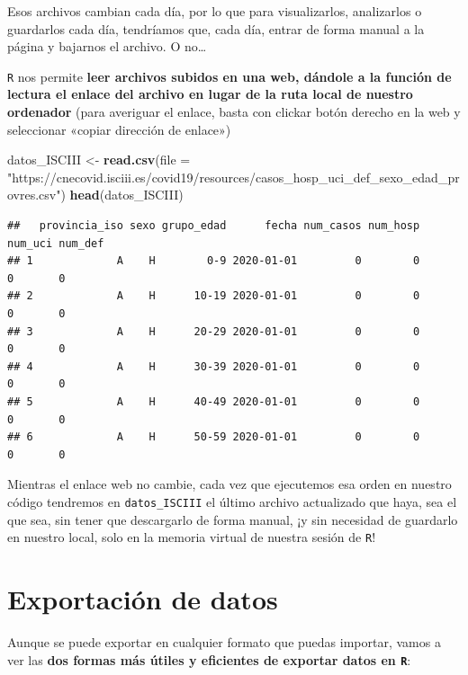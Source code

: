 \documentclass[11pt,]{book}
\newenvironment{Shaded}{\begin{snugshade}}{\end{snugshade}}
\newcommand{\DataTypeTok}[1]{\textcolor[rgb]{0.27,0.27,0.27}{#1}}
\newcommand{\KeywordTok}[1]{\textcolor[rgb]{0.27,0.27,0.27}{\textbf{#1}}}
\newcommand{\NormalTok}[1]{#1}
\newcommand{\StringTok}[1]{\textcolor[rgb]{0.5,0.5,0.5}{#1}}
\begin{document}
Esos archivos cambian cada día, por lo que para visualizarlos, analizarlos o guardarlos cada día, tendríamos que, cada día, entrar de forma manual a la página y bajarnos el archivo. O no\ldots{}

\texttt{R} nos permite \textbf{leer archivos subidos en una web, dándole a la función de lectura el enlace del archivo en lugar de la ruta local de nuestro ordenador} (para averiguar el enlace, basta con clickar botón derecho en la web y seleccionar «copiar dirección de enlace»)

\begin{Shaded}
\begin{Highlighting}[]
\NormalTok{datos_ISCIII <-}\StringTok{ }\KeywordTok{read.csv}\NormalTok{(}\DataTypeTok{file =} \StringTok{"https://cnecovid.isciii.es/covid19/resources/casos_hosp_uci_def_sexo_edad_provres.csv"}\NormalTok{)}
\KeywordTok{head}\NormalTok{(datos_ISCIII)}
\end{Highlighting}
\end{Shaded}

\begin{verbatim}
##   provincia_iso sexo grupo_edad      fecha num_casos num_hosp num_uci num_def
## 1             A    H        0-9 2020-01-01         0        0       0       0
## 2             A    H      10-19 2020-01-01         0        0       0       0
## 3             A    H      20-29 2020-01-01         0        0       0       0
## 4             A    H      30-39 2020-01-01         0        0       0       0
## 5             A    H      40-49 2020-01-01         0        0       0       0
## 6             A    H      50-59 2020-01-01         0        0       0       0
\end{verbatim}

Mientras el enlace web no cambie, cada vez que ejecutemos esa orden en nuestro código tendremos en \texttt{datos\_ISCIII} el último archivo actualizado que haya, sea el que sea, sin tener que descargarlo de forma manual, ¡y sin necesidad de guardarlo en nuestro local, solo en la memoria virtual de nuestra sesión de \texttt{R}!

\hypertarget{exportaciuxf3n-de-datos}{%
\section{Exportación de datos}\label{exportaciuxf3n-de-datos}}

Aunque se puede exportar en cualquier formato que puedas importar, vamos a ver las \textbf{dos formas más útiles y eficientes de exportar datos en \texttt{R}}:
\end{document}
